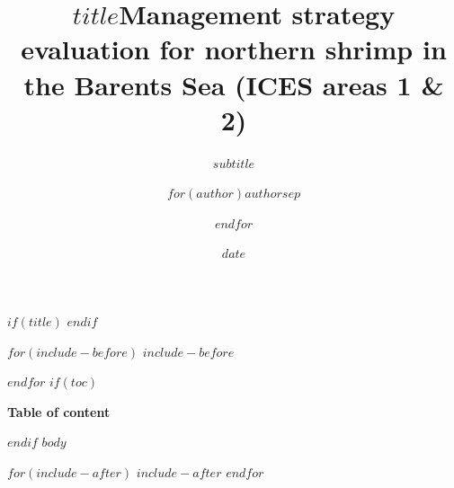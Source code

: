 \documentclass[$if(fontsize)$$fontsize$,$endif$$if(handout)$handout,$endif$$if(beamer)$ignorenonframetext,$endif$$if(aspectratio)$aspectratio=$aspectratio$,$endif$$if(notes)$notes=$notes$,$endif$$for(classoption)$$classoption$$sep$,$endfor$]{$documentclass$}
\title{$title$}
\subtitle{$subtitle$}
\author[$for(shortauthor)$$shortauthor$$sep$ \and $endfor$]{$for(author)$$author$$sep$ \and $endfor$}
\institute{$for(institute)$$institute$$sep$ \and $endfor$}
\date{$date$}
\title{\bfseries \LARGE Management strategy evaluation for northern shrimp in the Barents Sea (ICES areas 1 \& 2)}
\begin{document}
$if(title)$
\frame{\titlepage}
$endif$

$for(include-before)$
$include-before$

$endfor$
$if(toc)$
\begin{frame}{\bf Table of content}
\tableofcontents
\end{frame}
$endif$
$body$

$for(include-after)$
$include-after$
$endfor$
\end{document}
